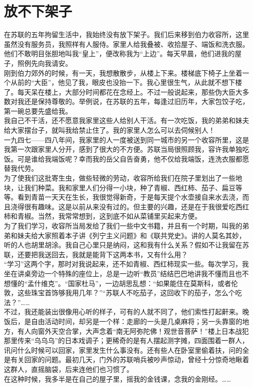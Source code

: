 \fancyhead[RO]{} %
\fancyhead[LE]{} %
\chapter*{放不下架子}
\thispagestyle{empty}
在苏联的五年拘留生活中，我始终没有放下架子。我们后来移到伯力收容所，这里虽然没有服务员，我照样有人服侍。家里人给我叠被、收拾屋子、端饭和洗衣服。他们不敢明目张胆地叫我“皇上”，便改称我为“上边”。每天早晨，他们进我的屋子，照例先向我请安。\\

刚到伯力郊外的时候，有一天，我想散散步，从楼上下来。楼梯底下椅子上坐着一个从前的“大臣”，他见了我，眼皮也没抬一下。我心里很生气，从此就不想下楼了。每天呆在楼上，大部分时间都花在念经上。不过一般说起来，那些伪大臣大多数对我还是保持尊敬的。举例说，在苏联的五年，每逢过旧历年，大家包饺子吃，第一碗总要先盛给我。\\

我自己不干活，还不愿意我家里这些人给别人干活。有一次吃饭，我的弟弟和妹夫给大家摆台子，就叫我给禁止住了。我的家里人怎么可以去伺候别人！\\

一九四七——四八年间，我家里的人一度被送到同一城市的另一个收容所里，这是我第一次跟家里人分开，感到了很大的不方便。苏联当局很照顾我，容许我单独吃饭。可是谁给我端饭呢？幸而我的岳父自告奋勇，他不仅给我端饭，连洗衣服都愿替我代劳。\\

为了使我们这批寄生虫，做些轻微的劳动，收容所给我们在院子里划出了一些地块，让我们种菜。我和家里人们分得一小块，种了青椒、西红柿、茄子、扁豆等等。看到青苗一天天在生长，我很觉得新奇，于是每天提个水壶接自来水去浇，而且浇得很有趣味。这是以前从来没有过的。但主要的兴趣，还是在于我很爱吃西红柿和青椒。当然，我常常想到，这到底不如从菜铺里买起来方便。\\

为了我们学习，收容所当局发给了我们一些中文书籍，并且有一个时期，叫我的弟弟和妹夫给大家照着本子讲《列宁主义问题》和《联共党史》。讲的人莫名其妙，听的人也胡里胡涂。我自己心里只是纳闷，这和我有什么关系？假如不让我留在苏联，还要把我送回去，我就是能背下这两本书，又有什么用？\\

“学习”这两个字，那时对我说起来，还不如青椒、西红柿现实一些。每次学习，我坐在讲桌旁边一个特殊的座位上，总是一边听“教员”结结巴巴地讲我不懂而且也不想懂的“孟什维克”。“国家杜马”，一边胡思乱想：“如果能住在莫斯科，或者伦敦，这些珠宝首饰够我用几年？”“苏联人不吃茄子，这回收下的茄子，怎么个吃法？”……\\

不过，我还能装出很像用心听的样子，可有的人就不同了，他们索性打起鼾来。晚饭后，是自由活动时间，却另是一个样：走廊的一头是几桌麻将；另一头靠窗的地方，有人向窗外天空合掌，大声念着“南无阿弥陀佛！观世音菩萨！”楼上日本战犯那里传来“乌乌乌”的日本戏调子；更稀奇的是有人摆起测字摊，四面围着一群人，讯问什么时候可以回家，家里发生什么事没有。还有些人在卧室里偷着扶，问的全是有关回家的问题。最初几天，门外的苏联哨兵被吵声惊动，曾经十分惊奇地瞅着这群人，直摇脑袋，后来连他们也习惯了。\\

在这种时候，我多半是在自己的屋子里，摇我的金钱课，念我的金刚经。……